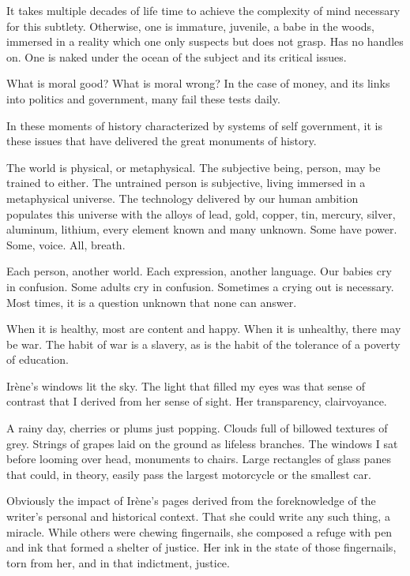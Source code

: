 It takes multiple decades of life time to achieve the complexity of
mind necessary for this subtlety.  Otherwise, one is immature,
juvenile, a babe in the woods, immersed in a reality which one only
suspects but does not grasp.  Has no handles on.  One is naked under
the ocean of the subject and its critical issues.

What is moral good?  What is moral wrong?  In the case of money, and
its links into politics and government, many fail these tests daily.

In these moments of history characterized by systems of self
government, it is these issues that have delivered the great monuments
of history.


\vfill
\break

The world is physical, or metaphysical.  The subjective being, person,
may be trained to either.  The untrained person is subjective, living
immersed in a metaphysical universe.  The technology delivered by our
human ambition populates this universe with the alloys of lead, gold,
copper, tin, mercury, silver, aluminum, lithium, every element known
and many unknown. \break Some have power.  Some, voice.  All, breath.

Each person, another world.  Each expression, another language.  Our
babies cry in confusion.  Some adults cry in confusion.  Sometimes a
crying out is necessary.  Most times, it is a question unknown that
none can answer.

When it is healthy, most are content and happy.  When it is unhealthy,
there may be war.  The habit of war is a slavery, as is the habit of
the tolerance of a poverty of education.

\vfill
\break

﻿Ir\`{e}ne's windows lit the sky.  The light that filled my eyes was
that sense of contrast that I derived from her sense of sight.  Her
transparency, clairvoyance.

A rainy day, cherries or plums just popping.  Clouds full of billowed
textures of grey.  Strings of grapes laid on the ground as lifeless
branches.  The windows I sat before looming over head, monuments to
chairs.  Large rectangles of glass panes that could, in theory, easily
pass the largest motorcycle or the smallest car.

Obviously the impact of Ir\`{e}ne's pages derived from the
foreknowledge of the writer's personal and historical context.  That
she could write any such thing, a miracle.  While others were chewing
fingernails, she composed a refuge with pen and ink that formed a
shelter of justice.  Her ink in the state of those fingernails, torn
from her, and in that indictment, justice.

